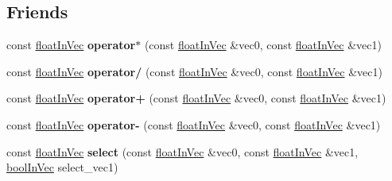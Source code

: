 \subsection*{Friends}
\begin{DoxyCompactItemize}
\item 
\mbox{\label{classVectormath_1_1floatInVec_a3245c1626b36c482334db45b5b86721c}} 
const \hyperlink{classVectormath_1_1floatInVec}{float\+In\+Vec} {\bfseries operator$\ast$} (const \hyperlink{classVectormath_1_1floatInVec}{float\+In\+Vec} \&vec0, const \hyperlink{classVectormath_1_1floatInVec}{float\+In\+Vec} \&vec1)
\item 
\mbox{\label{classVectormath_1_1floatInVec_a45e96ad304260d908bfc6d2b51b210d2}} 
const \hyperlink{classVectormath_1_1floatInVec}{float\+In\+Vec} {\bfseries operator/} (const \hyperlink{classVectormath_1_1floatInVec}{float\+In\+Vec} \&vec0, const \hyperlink{classVectormath_1_1floatInVec}{float\+In\+Vec} \&vec1)
\item 
\mbox{\label{classVectormath_1_1floatInVec_a9e67ab843002e647fa7bb2caed760bdc}} 
const \hyperlink{classVectormath_1_1floatInVec}{float\+In\+Vec} {\bfseries operator+} (const \hyperlink{classVectormath_1_1floatInVec}{float\+In\+Vec} \&vec0, const \hyperlink{classVectormath_1_1floatInVec}{float\+In\+Vec} \&vec1)
\item 
\mbox{\label{classVectormath_1_1floatInVec_ac6c858483e69952c29682d153854fbe2}} 
const \hyperlink{classVectormath_1_1floatInVec}{float\+In\+Vec} {\bfseries operator-\/} (const \hyperlink{classVectormath_1_1floatInVec}{float\+In\+Vec} \&vec0, const \hyperlink{classVectormath_1_1floatInVec}{float\+In\+Vec} \&vec1)
\item 
\mbox{\label{classVectormath_1_1floatInVec_a2970b847bee6dc51a58e7b308ab866c0}} 
const \hyperlink{classVectormath_1_1floatInVec}{float\+In\+Vec} {\bfseries select} (const \hyperlink{classVectormath_1_1floatInVec}{float\+In\+Vec} \&vec0, const \hyperlink{classVectormath_1_1floatInVec}{float\+In\+Vec} \&vec1, \hyperlink{classVectormath_1_1boolInVec}{bool\+In\+Vec} select\+\_\+vec1)
\item 
\mbox{\label{classVectormath_1_1floatInVec_a3245c1626b36c482334db45b5b86721c}} 

\end{DoxyCompactItemize}
